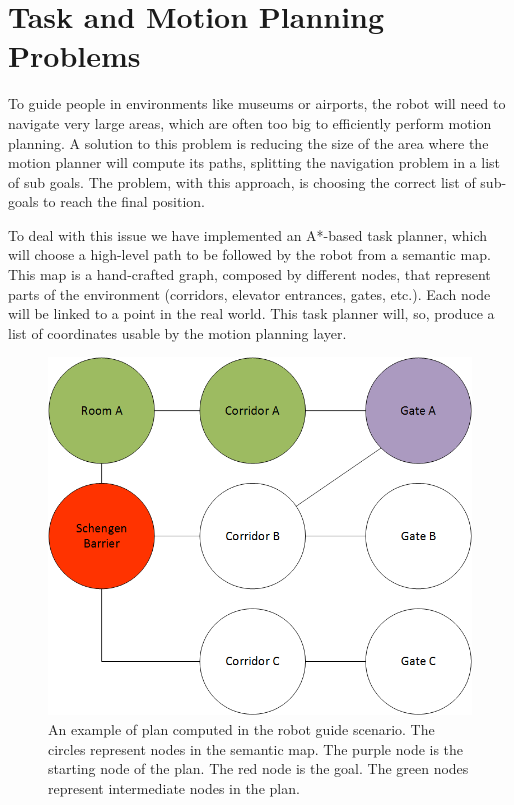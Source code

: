 \section{Task and Motion Planning Problems}
\label{sec:spencer-planning}
To guide people in environments like museums or airports, the robot will need to navigate very large areas, which are often too big to efficiently perform motion planning. A solution to this problem is reducing the size of the area where the motion planner will compute its paths, splitting the navigation problem in a list of sub goals. The problem, with this approach,  is choosing the correct list of sub-goals to reach the final position.  

To deal with this issue we have implemented an A*-based task planner, which will choose a high-level path to be followed by the robot from a semantic map. This map is a hand-crafted graph, composed by different nodes, that represent parts of the environment (corridors, elevator entrances, gates, etc.). Each node will be linked to a point in the real world. This task planner will, so, produce a list of coordinates usable by the motion planning layer. 

\begin{figure}[ht!]
	\centering
	\includegraphics[scale=0.45]{img/case_study/spencer/ShengenTaskPlanner.png}
	\caption[Robot Guide Plan]{An example of plan computed in the robot guide scenario. The circles represent nodes in the semantic map. The purple node is the starting node of the plan. The red node is the goal. The green nodes represent intermediate nodes in the plan.}
	\label{fig:spencer-semantic_plan}
\end{figure}


